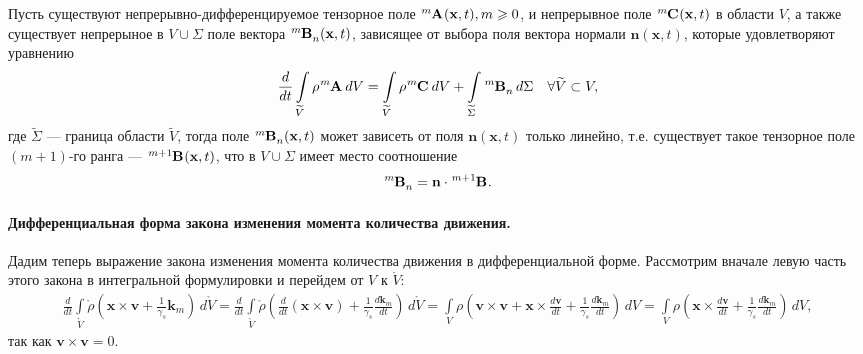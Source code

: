 \begin{theorem*}
	Пусть существуют непрерывно-дифференцируемое тензорное поле $\tensor[^m]{\mathbf{A}}{}(\mathbf{x}, t), m \geqslant 0$, и непрерывное поле $\tensor[^m]{\mathbf{C}}{}(\mathbf{x}, t)$ в области $V$, а также существует непрерыное в $V \cup \Sigma$ поле вектора $\tensor[^m]{\mathbf{B}}{_n}(\mathbf{x}, t)$, зависящее от выбора поля вектора нормали $\mathbf{n}(\mathbf{x}, t)$, которые удовлетворяют уравнению
	\begin{equation*}
		\frac{d}{dt} \int\limits_{\widetilde{V}} \rho \tensor[^m]{\mathbf{A}}{} \, dV = \int\limits_{\widetilde{V}} \rho \tensor[^m]{\mathbf{C}}{} \, dV + \int\limits_{\widetilde{\Sigma}} \tensor[^m]{\mathbf{B}}{_n} \, d\Sigma \quad \forall \widetilde{V} \subset V,
	\end{equation*}
	где $\widetilde{\Sigma}$ --- граница области $\widetilde{V}$, тогда поле $\tensor[^m]{\mathbf{B}}{_n}(\mathbf{x}, t)$ может зависеть от поля $\mathbf{n}(\mathbf{x}, t)$ только линейно, т.е. существует такое тензорное поле $(m + 1)$-го ранга --- $\tensor[^{m + 1}]{\mathbf{B}}{}(\mathbf{x}, t)$, что в $V \cup \Sigma$ имеет место соотношение 
	\begin{equation*}
		\tensor[^m]{\mathbf{B}}{_n} = \mathbf{n} \cdot \tensor[^{m + 1}]{\mathbf{B}}{}.
	\end{equation*} 
\end{theorem*}

\paragraph{Дифференциальная форма закона изменения момента количества движения.} Дадим теперь выражение закона изменения момента количества движения в дифференциальной форме. Рассмотрим вначале левую часть этого закона в интегральной формулировки и перейдем от $V$ к $\mathring{V}$:
\begin{align*}
	\frac{d}{dt} \int\limits_{\mathring{V}} \mathring{\rho} \left(\mathbf{x} \times \mathbf{v} + \frac{1}{\gamma_s} \mathbf{k}_{m}\right) \, d\mathring{V} = \frac{d}{dt} \int\limits_{\mathring{V}} \mathring{\rho}\left(\frac{d}{dt} (\mathbf{x} \times \mathbf{v}) + \frac{1}{\gamma_s} \frac{d\mathbf{k}_m}{dt}\right) \, d\mathring{V} = \int\limits_{V} \rho \left(\mathbf{v} \times \mathbf{v} + \mathbf{x} \times \frac{d\mathbf{v}}{dt} + \frac{1}{\gamma_s} \frac{d\mathbf{k}_m}{dt}\right) \, dV = \int\limits_{V} \rho \left(\mathbf{x} \times \frac{d \mathbf{v}}{dt} + \frac{1}{\gamma_s} \frac{d \mathbf{k}_m}{dt}\right) \, dV,
\end{align*}
так как $\mathbf{v} \times \mathbf{v} = 0$. 


